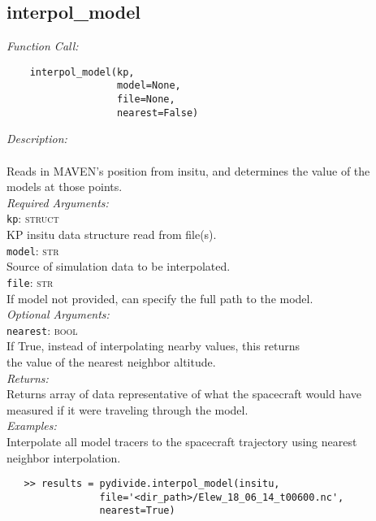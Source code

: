\documentclass{article}
\begin{document}
\subsection{interpol\_model}
\label{subsec:interpolmodel}
\vspace{-5mm}
\textit{Function Call:}\\
\vspace{-10mm}
\begin{verbatim}
    interpol_model(kp,
                   model=None,
                   file=None,
                   nearest=False)
\end{verbatim}
\vspace{-5mm}
\noindent
\textit{Description:}\\
\indent \\
\indent Reads in MAVEN's position from insitu, and determines the value of the\\
\indent models at those points.\\
\textit{Required Arguments:}\\
\indent \texttt{kp}: \textsc{struct}\\
\indent \indent KP insitu data structure read from file(s).\\ 
\indent \texttt{model}: \textsc{str}\\
\indent \indent Source of simulation data to be interpolated.\\
\indent \texttt{file}: \textsc{str}\\
\indent \indent If model not provided, can specify the full path to the model.\\
\textit{Optional Arguments:}\\
\indent \texttt{nearest}: \textsc{bool}\\
\indent \indent If True, instead of interpolating nearby values, this returns\\
\indent \indent the value of the nearest neighbor altitude.\\
\textit{Returns:}\\
\indent Returns array of data representative of what the spacecraft would have\\
\indent measured if it were traveling through the model.\\
\noindent \textit{Examples:}\\
\indent Interpolate all model tracers to the spacecraft trajectory using nearest\\
\indent neighbor interpolation.
\vspace{-5mm}
\begin{verbatim}
   >> results = pydivide.interpol_model(insitu,
                file='<dir_path>/Elew_18_06_14_t00600.nc',
                nearest=True)
\end{verbatim}
\end{document}
